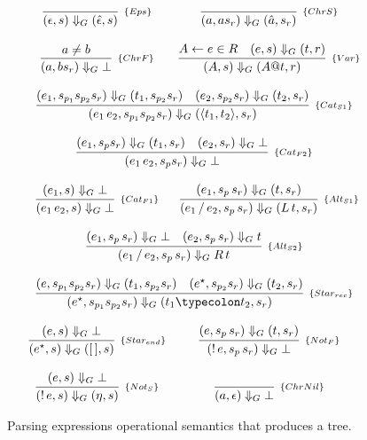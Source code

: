 \begin{figure}[H]
   \[
      \begin{array}{cc}
         \infer[_{\{Eps\}}]{(\epsilon,s) \Downarrow_G (\hat{\epsilon},s)}{} &
         \infer[_{\{ChrS\}}]{(a,as_r) \Downarrow_G (\hat{a},s_r)}{} \\ \\
         \infer[_{\{ChrF\}}]{(a,bs_r) \Downarrow_G \bot}{a \neq b} &
         \infer[_{\{Var\}}]{(A,s) \Downarrow_G (A@t, r)}
                        {A \leftarrow e \in R & (e,s) \Downarrow_G (t,r)} \\ \\
         \multicolumn{2}{c}{
            \infer[_{\{Cat_{S1}\}}]{(e_1\,e_2,s_{p_1}s_{p_2}s_r) \Downarrow_G (\langle t_1,t_2 \rangle, s_r)}
                                 {(e_1,s_{p_1}s_{p_2}s_r) \Downarrow_G (t_1,s_{p_2}s_r) &
                                 (e_2,s_{p_2}s_r)\Downarrow_G (t_2,s_r)}
         } \\ \\
         \multicolumn{2}{c}{
            \infer[_{\{Cat_{F2}\}}]{(e_1\,e_2,s_ps_r) \Downarrow_G \bot}
                                 { (e_1,s_ps_r) \Downarrow_G (t_1,s_r) &
                                    (e_2,s_r) \Downarrow_G \bot}} \\ \\
         \infer[_{\{Cat_{F1}\}}]{(e_1\,e_2,s)\Downarrow_G \bot}{(e_1,s) \Downarrow_G \bot} &
         \infer[_{\{Alt_{S1}\}}]{(e_1\,/\,e_2,s_p\,s_r) \Downarrow_G (L \, t,s_r)}
                                {(e_1,s_p\,s_r)\Downarrow_G (t,s_r)} \\ \\
         \multicolumn{2}{c}{
            \infer[_{\{Alt_{S2}\}}]{(e_1\,/\,e_2,s_p\,s_r) \Downarrow_G R \, t}
                                  {(e_1,s_p\,s_r)\Downarrow_G \bot &
                                   (e_2,s_p\,s_r)\Downarrow_G t}
         } \\ \\
         \multicolumn{2}{c}{
            \infer[_{\{Star_{rec}\}}]{(e^\star,s_{p_1}s_{p_2}s_r) \Downarrow_G (t_1  \typecolon  t_2,s_r)}
                                 {(e,s_{p_1}s_{p_2}s_r) \Downarrow_G (t_1,s_{p_2}s_r) &
                                  (e^\star, s_{p_2}s_r) \Downarrow_G (t_2,s_r)}
         } \\ \\
         \infer[_{\{Star_{end}\}}]{(e^\star,s) \Downarrow_G ([\,],s)}
                                    {(e,s) \Downarrow_G \bot} &
         \infer[_{\{Not_F\}}]{(!\,e,s_p\,s_r) \Downarrow_G \bot}
                          {(e,s_p\,s_r) \Downarrow_G (t,s_r)}\\ \\
         \infer[_{\{Not_S\}}]{(!\,e,s) \Downarrow_G (\eta,s)}
         {(e,s) \Downarrow_G \bot}
           &
         \infer[_{\{ChrNil\}}]{(a,\epsilon) \Downarrow_G \bot}{}
      \end{array}
   \]
   \centering
   \caption{Parsing expressions operational semantics that produces a tree.}
   \label{fig:peg-tree-semantics}
\end{figure}

